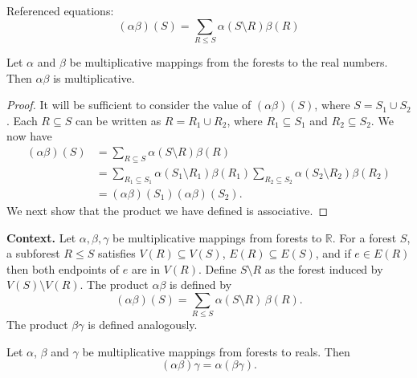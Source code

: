 \begin{theorem}
Referenced equations:
\begin{equation}
    (\alpha\beta)(S) = \sum_{R \le S} \alpha(S \setminus R)\beta(R) \tag{383a}
\end{equation}

\begin{lemma}

  \label{lem:383A}
Let $\alpha$ and $\beta$ be multiplicative mappings from the forests to the real numbers. Then $\alpha\beta$ is multiplicative.
\end{lemma}

\begin{proof}
It will be sufficient to consider the value of $(\alpha\beta)(S)$, where $S = S_1 \cup S_2$.
Each $R \subseteq S$ can be written as $R = R_1 \cup R_2$, where $R_1 \subseteq S_1$ and $R_2 \subseteq S_2$. We now have
\[
\begin{aligned}
(\alpha\beta)(S) &= \sum_{R \subseteq S} \alpha(S \setminus R)\beta(R) \\
&= \sum_{R_1 \subseteq S_1} \alpha(S_1 \setminus R_1)\beta(R_1) \sum_{R_2 \subseteq S_2} \alpha(S_2 \setminus R_2)\beta(R_2) \\
&= (\alpha\beta)(S_1)(\alpha\beta)(S_2).
\end{aligned}
\]
We next show that the product we have defined is associative.
\end{proof}

\noindent\textbf{Context.}
Let $\alpha,\beta,\gamma$ be multiplicative mappings from forests to $\mathbb{R}$.  
For a forest $S$, a subforest $R\le S$ satisfies $V(R)\subseteq V(S)$, $E(R)\subseteq E(S)$, and if $e\in E(R)$ then both endpoints of $e$ are in $V(R)$.  
Define $S\setminus R$ as the forest induced by $V(S)\setminus V(R)$.  
The product $\alpha\beta$ is defined by
\begin{equation}
(\alpha\beta)(S)=\sum_{R\le S}\alpha(S\setminus R)\,\beta(R). \tag{383a}
\end{equation}
The product $\beta\gamma$ is defined analogously.

\begin{lemma}

  \label{lem:383B}
Let $\alpha$, $\beta$ and $\gamma$ be multiplicative mappings from forests to reals. Then
\[
(\alpha\beta)\gamma = \alpha(\beta\gamma).
\]
\end{lemma}


\end{theorem}

